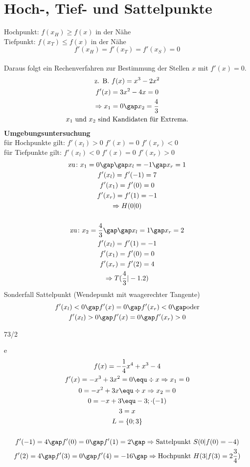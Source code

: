 \section{Hoch-, Tief- und Sattelpunkte}
Hochpunkt: $f(x_H) \geq f(x)$ in der Nähe \\
Tiefpunkt: $f(x_T) \leq f(x)$ in der Nähe \\
$$f'(x_H) = f'(x_T) = f'(x_S) = 0$$ \\
Daraus folgt ein Rechenverfahren zur Bestimmung der Stellen $x$ mit $f'(x) = 0$.
\begin{gather*}
  \text{z. B. } f(x) = x^3 - 2x^2 \\
  f'(x) = 3x^2 - 4x = 0 \\
  \Rightarrow x_1 = 0 \gap x_2 = \frac{4}{3} \\
  x_1 \text{ und } x_2 \text{ sind Kandidaten für Extrema.}
\end{gather*}
\newpage
\textbf{Umgebungsuntersuchung} \\
für Hochpunkte gilt: $f'(x_l) > 0$ $f'(x) = 0$ $f'(x_r) < 0$ \\
für Tiefpunkte gilt: $f'(x_l) < 0$ $f'(x) = 0$ $f'(x_r) > 0$
\begin{gather*}
  \text{zu} \colon x_1 = 0 \gap\gap x_l = -1 \gap x_r = 1 \\
  f'(x_l) = f'(-1) = 7 \\
  f'(x_1) = f'(0) = 0 \\
  f'(x_r) = f'(1) = -1 \\
  \Rightarrow H(0|0) \\\\
  \text{zu} \colon x_2 = \frac{4}{3} \gap\gap x_l = 1 \gap x_r = 2 \\
  f'(x_l) = f'(1) = -1 \\
  f'(x_1) = f'(0) = 0 \\
  f'(x_r) = f'(2) = 4 \\
  \Rightarrow T(\frac{4}{3}|-1.2)
\end{gather*}
Sonderfall Sattelpunkt (Wendepunkt mit waagerechter Tangente)
\begin{gather*}
  f'(x_l) < 0 \gap f'(x) = 0 \gap f'(x_r) < 0 \gap \text{oder} \\
  f'(x_l) > 0 \gap f'(x) = 0 \gap f'(x_r) > 0
\end{gather*}
\begin{exercise}{73/2}
  \item [e]
  \begin{gather*}
    f(x) = -\frac{1}{4}x^4 + x^3 - 4 \\
    f'(x) = -x^3 + 3x^2 = 0 \equ \div x \Rightarrow x_1 = 0 \\
    0 = -x^2 + 3x \equ \div x \Rightarrow x_2 = 0 \\
    0 = -x + 3 \equ -3; \cdot (-1) \\
    3 = x \\
    L = \{0; 3\} \\\\
    f'(-1) = 4 \gap f'(0) = 0 \gap f'(1) = 2 \gap \Rightarrow \text{Sattelpunkt } S(0|f(0) = -4) \\
    f'(2) = 4 \gap f'(3) = 0 \gap f'(4) = -16 \gap \Rightarrow \text{Hochpunkt } H(3|f(3) = 2\frac{3}{4})
  \end{gather*}
\end{exercise}
